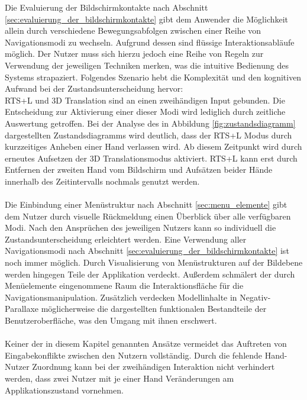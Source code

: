 Die Evaluierung der Bildschirmkontakte nach Abschnitt \ref{sec:evaluierung_der_bildschirmkontakte} gibt dem Anwender die Möglichkeit allein durch verschiedene Bewegungsabfolgen zwischen einer Reihe von Navigationsmodi zu wechseln. Aufgrund dessen sind flüssige Interaktionsabläufe möglich. Der Nutzer muss sich hierzu jedoch eine Reihe von Regeln zur Verwendung der jeweiligen Techniken merken, was die intuitive Bedienung des Systems strapaziert. Folgendes Szenario hebt die Komplexität und den kognitiven Aufwand bei der Zustandsunterscheidung hervor:
\\
RTS+L und 3D Translation sind an einen zweihändigen Input gebunden. Die Entscheidung zur Aktivierung einer dieser Modi wird lediglich durch zeitliche Auswertung getroffen. Bei der Analyse des in Abbildung \ref{fig:zustandsdiagramm} dargestellten Zustandsdiagramms wird deutlich, dass der RTS+L Modus durch kurzzeitiges Anheben einer Hand verlassen wird. Ab diesem Zeitpunkt wird durch erneutes Aufsetzen der 3D Translationsmodus aktiviert. RTS+L kann erst durch Entfernen der zweiten Hand vom Bildschirm und Aufsätzen beider Hände innerhalb des Zeitintervalls nochmals genutzt werden.
\\\\
Die Einbindung einer Menüstruktur nach Abschnitt \ref{sec:menu_elemente} gibt dem Nutzer durch visuelle Rückmeldung einen Überblick über alle verfügbaren Modi. Nach den Ansprüchen des jeweiligen Nutzers kann so individuell die Zustandsunterscheidung erleichtert werden. Eine Verwendung aller Navigationsmodi nach Abschnitt \ref{sec:evaluierung_der_bildschirmkontakte} ist noch immer möglich. Durch Visualisierung von Menüstrukturen auf der Bildebene werden hingegen Teile der Applikation verdeckt. Außerdem schmälert der durch Menüelemente eingenommene Raum die Interaktionsfläche für die Navigationsmanipulation. Zusätzlich verdecken Modellinhalte in Negativ-Parallaxe möglicherweise die dargestellten funktionalen Bestandteile der Benutzeroberfläche, was den Umgang mit ihnen erschwert. 
\\\\
Keiner der in diesem Kapitel genannten Ansätze vermeidet das Auftreten von Eingabekonflikte zwischen den Nutzern vollständig. Durch die fehlende Hand-Nutzer Zuordnung kann bei der zweihändigen Interaktion nicht verhindert werden, dass zwei Nutzer mit je einer Hand Veränderungen am Applikationszustand vornehmen.
